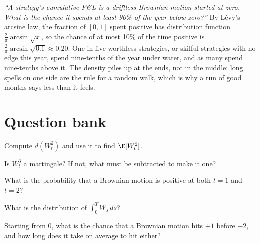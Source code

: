 \begin{example}\label{ex:iv:stochastic-calculus:arcsine}
\emph{``A strategy's cumulative P\&L is a driftless Brownian motion started at zero. What is the chance it spends at least
90\% of the year below zero?''} By Lévy's arcsine law, the fraction of $[0, 1]$ spent positive has distribution function
$\tfrac2\pi\arcsin\sqrt{x}$, so the chance of at most 10\% of the time positive is $\tfrac2\pi\arcsin\sqrt{0.1} \approx
0.20$. One in five worthless strategies, or skilful strategies with no edge this year, spend nine-tenths of the year under
water, and as many spend nine-tenths above it. The density piles up at the ends, not in the middle: long spells on one
side are the rule for a random walk, which is why a run of good months says less than it feels.
\end{example}

\section{Question bank}

\begin{interviewq}\label{iq:iv:stochastic-calculus:1}
Compute $d(W_t^2)$ and use it to find $\E[W_t^2]$.
\end{interviewq}

\begin{interviewq}\label{iq:iv:stochastic-calculus:2}
Is $W_t^3$ a martingale? If not, what must be subtracted to make it one?
\end{interviewq}

\begin{interviewq}\label{iq:iv:stochastic-calculus:3}
What is the probability that a Brownian motion is positive at both $t = 1$ and $t = 2$?
\end{interviewq}

\begin{interviewq}\label{iq:iv:stochastic-calculus:4}
What is the distribution of $\int_0^T W_s\,ds$?
\end{interviewq}

\begin{interviewq}\label{iq:iv:stochastic-calculus:5}
Starting from 0, what is the chance that a Brownian motion hits $+1$ before $-2$, and how long does it take on average to hit
either?
\end{interviewq}

